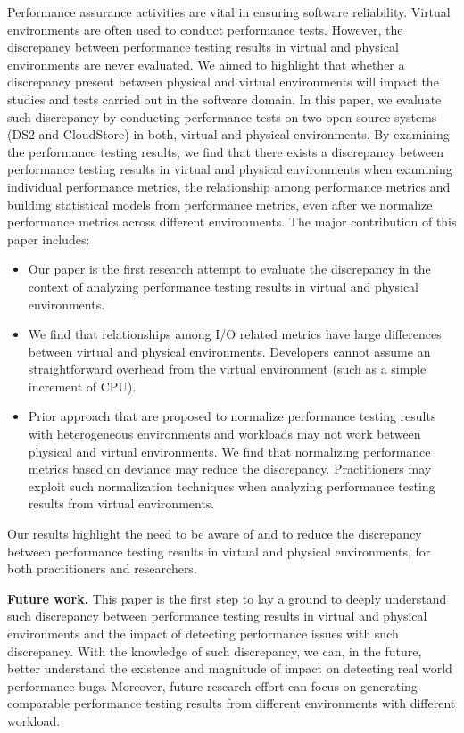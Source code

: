 \documentclass[smallextended]{svjour3}       %
\begin{document}
Performance assurance activities are vital in ensuring software reliability. Virtual environments are often used to conduct performance tests. However, the discrepancy between performance testing results in virtual and physical environments are never evaluated. We aimed to highlight that whether a discrepancy present between physical and virtual environments will impact the studies and tests carried out in the software domain. In this paper, we evaluate such discrepancy by conducting performance tests on two open source systems (DS2 and CloudStore) in both, virtual and physical environments. By examining the performance testing results, we find that there exists a discrepancy between performance testing results in virtual and physical environments when examining individual performance metrics, the relationship among performance metrics and building statistical models from performance metrics, even after we normalize performance metrics across different environments. The major contribution of this paper includes: 
\begin{itemize} 
	\item Our paper is the first research attempt to evaluate the discrepancy in the context of analyzing performance testing results in virtual and physical environments.
	\item We find that relationships among I/O related metrics have large differences between virtual and physical environments. Developers cannot assume an straightforward overhead from the virtual environment (such as a simple increment of CPU).
	\item Prior approach that are proposed to normalize performance testing results with heterogeneous environments and workloads may not work between physical and virtual environments. We find that normalizing performance metrics based on deviance may reduce the discrepancy. Practitioners may exploit such normalization techniques when analyzing performance testing results from virtual environments.
\end{itemize}

Our results highlight the need to be aware of and to reduce the discrepancy between performance testing results in virtual and physical environments, for both practitioners and researchers. 

\noindent \textbf{Future work.} This paper is the first step to lay a ground to deeply understand such discrepancy between performance testing results in virtual and physical environments and the impact of detecting performance issues with such discrepancy. With the knowledge of such discrepancy, we can, in the future, better understand the existence and magnitude of impact on detecting real world performance bugs. Moreover, future research effort can focus on generating comparable performance testing results from different environments with different workload. 
\end{document}
